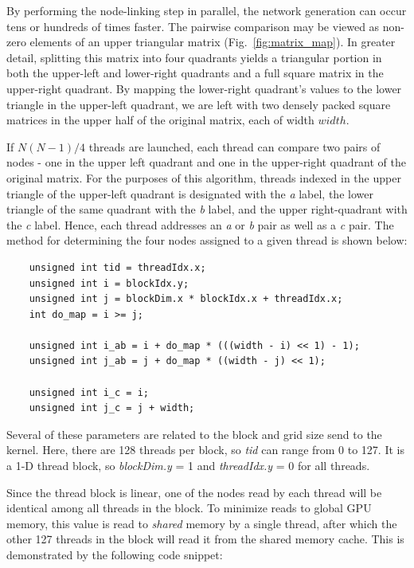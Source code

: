 \documentclass[preprint,notitlepage,amsmath,amssymb,floatfix]{revtex4-1}
\begin{document}
By performing the node-linking step in parallel, the network generation can occur tens or hundreds of times faster.
The pairwise comparison may be viewed as non-zero elements of an upper triangular matrix (Fig.~\ref{fig:matrix_map}).
In greater detail, splitting this matrix into four quadrants yields a triangular portion in both the upper-left and lower-right quadrants and a full square matrix in the upper-right quadrant.
By mapping the lower-right quadrant's values to the lower triangle in the upper-left quadrant, we are left with two densely packed square matrices in the upper half of the original matrix, each of width $width$. \par
If $N(N-1)/4$ threads are launched, each thread can compare two pairs of nodes - one in the upper left quadrant and one in the upper-right quadrant of the original matrix.
For the purposes of this algorithm, threads indexed in the upper triangle of the upper-left quadrant is designated with the \textit{a} label, the lower triangle of the same quadrant with the \textit{b} label, and the upper right-quadrant with the \textit{c} label.  
Hence, each thread addresses an \textit{a} or \textit{b} pair as well as a \textit{c} pair.  
The method for determining the four nodes assigned to a given thread is shown below:

\begin{lstlisting}
	unsigned int tid = threadIdx.x;
	unsigned int i = blockIdx.y;
	unsigned int j = blockDim.x * blockIdx.x + threadIdx.x;
	int do_map = i >= j;

	unsigned int i_ab = i + do_map * (((width - i) << 1) - 1);
	unsigned int j_ab = j + do_map * ((width - j) << 1);

	unsigned int i_c = i;
	unsigned int j_c = j + width;
\end{lstlisting}

\noindent Several of these parameters are related to the block and grid size send to the kernel.  
Here, there are 128 threads per block, so \textit{tid} can range from 0 to 127.  
It is a 1-D thread block, so \textit{blockDim.y} = 1 and \textit{threadIdx.y} = 0 for all threads. \par
Since the thread block is linear, one of the nodes read by each thread will be identical among all threads in the block.
To minimize reads to global GPU memory, this value is read to \textit{shared} memory by a single thread, after which the other 127 threads in the block will read it from the shared memory cache.
This is demonstrated by the following code snippet:
\end{document}
